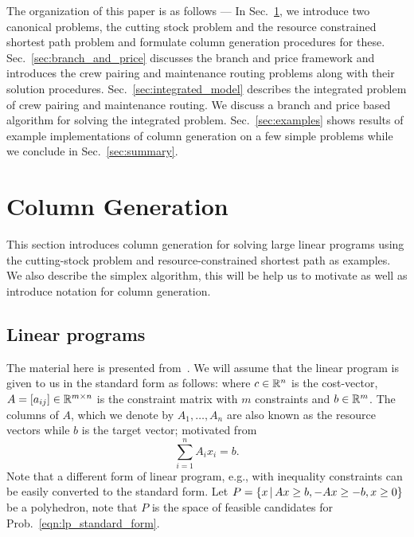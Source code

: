 \documentclass[letterpaper, 10pt, twocolumn, reqno]{amsart}
\begin{document}
The organization of this paper is as follows --- In Sec.~\ref{sec:column_generation}, we introduce two canonical problems, the cutting stock problem and the
resource constrained shortest path problem and formulate column generation procedures for these. Sec.~\ref{sec:branch_and_price} discusses the branch and
price framework and introduces the crew pairing and maintenance routing problems along with their solution procedures. Sec.~\ref{sec:integrated_model}
describes the integrated problem of crew pairing and maintenance routing. We discuss a branch and price based algorithm for solving the integrated problem.
Sec.~\ref{sec:examples} shows results of example implementations of column generation on a few simple problems while we conclude in Sec.~\ref{sec:summary}.

\section{Column Generation}
\label{sec:column_generation}

This section introduces column generation for solving large linear programs using the cutting-stock problem and resource-constrained shortest path as examples. We also describe the simplex algorithm, this will be help us to motivate as well as introduce notation for column generation.

\subsection{Linear programs}
\label{ssec:lp_standard}

The material here is presented from~\cite{bertsimas1997introduction}. We will assume that the linear program is given to us in the standard form as follows:
where $c \in \mathbb{R}^n$ is the cost-vector, $A = [a_{ij}] \in \mathbb{R}^{m \times n}$ is the constraint matrix with $m$ constraints and $b \in \mathbb{R}^m$. The columns of $A$, which we denote by $A_1, \ldots, A_n$ are also known as the resource vectors while $b$ is the target vector; motivated from
$$\sum_{i=1}^n A_i x_i =b.$$
Note that a different form of linear program, e.g., with inequality constraints can be easily converted to the standard form.
Let $P = \left\{x \, \vert \, Ax \geq b, -Ax \geq -b, x \geq 0\right\}$ be a polyhedron, note that $P$ is the space of feasible candidates for Prob.~\eqref{eqn:lp_standard_form}.
\end{document}
